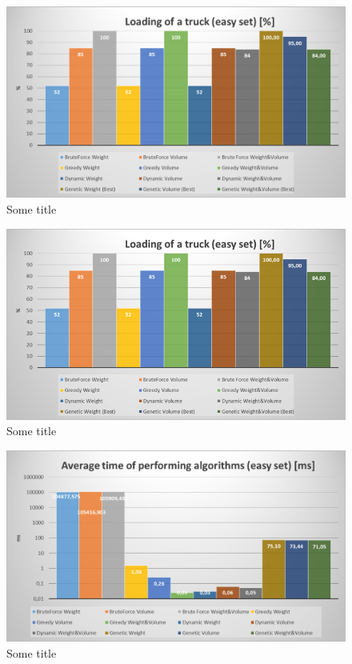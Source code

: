 \documentclass[conference,compsoc]{IEEEtran}
\begin{document}
\begin{figure}[hb]
  \centering
  \includegraphics[width=\columnwidth]{image003.png}
  \caption{Some title}
\end{figure}

\begin{figure}[hb]
  \centering
  \includegraphics[width=\columnwidth]{image004.png}
  \caption{Some title}
\end{figure}

\begin{figure}[hb]
  \centering
  \includegraphics[width=\columnwidth]{image006.png}
  \caption{Some title}
\end{figure}
\end{document}
